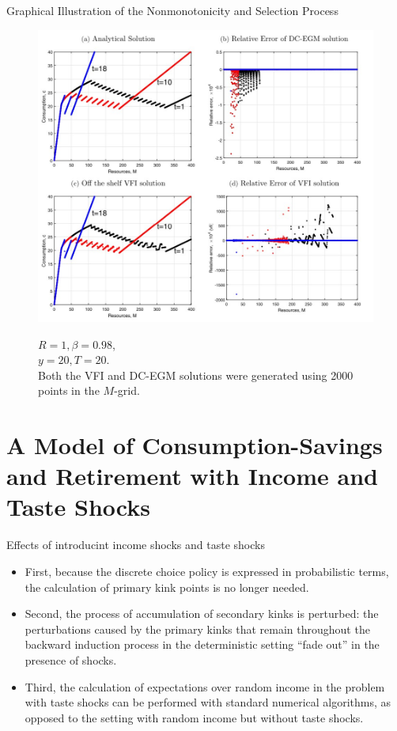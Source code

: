 \documentclass[aspectratio=169]{beamer}
\begin{document}
\begin{frame}{Graphical Illustration of the Nonmonotonicity and Selection Process}
	\begin{figure}[htbp!]
		\begin{minipage}{0.55\linewidth}
			\includegraphics[scale=0.55]{fig2.jpg}
		\end{minipage}
		\begin{minipage}{0.4\linewidth}
			$R = 1, \beta = 0.98$, \\ $y = 20, T = 20$. \\ Both the VFI and DC-EGM solutions were generated using 2000 points in the $M$-grid.
		\end{minipage}
	\end{figure}
	
\end{frame}

\section[Stochastic Model]{A Model of Consumption-Savings and Retirement with Income and Taste Shocks}

\begin{frame}{Effects of introducint income shocks and taste shocks}
	\begin{itemize}
		\item First, because the discrete choice policy is expressed in probabilistic terms, the calculation of primary kink points is no longer needed.
		\item Second, the process of accumulation of secondary kinks is perturbed: the perturbations caused by the primary kinks that remain throughout the backward induction process in the deterministic setting ``fade out'' in the presence of shocks.
		\item Third, the calculation of expectations over random income in the problem with taste shocks can be performed with standard numerical algorithms, as opposed to the setting with random income but without taste shocks.
	\end{itemize}
\end{frame}
\end{document}

